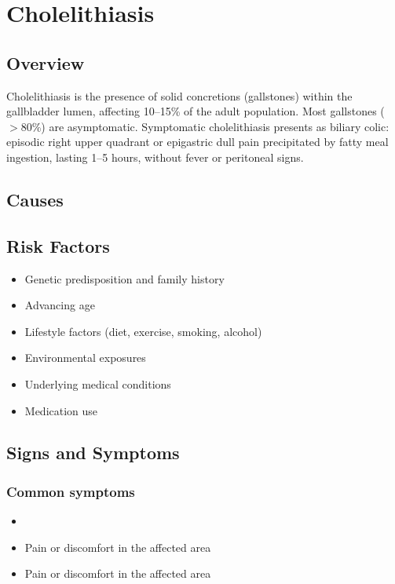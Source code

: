\chapter{Cholelithiasis}
\label{sec:Cholelithiasis}

\section{Overview}
Cholelithiasis is the presence of solid concretions (gallstones) within the gallbladder lumen, affecting 10--15\% of the adult population. Most gallstones ($>80\%$) are asymptomatic. Symptomatic cholelithiasis presents as biliary colic: episodic right upper quadrant or epigastric dull pain precipitated by fatty meal ingestion, lasting 1--5 hours, without fever or peritoneal signs.
\section{Causes}
\section{Risk Factors}

\begin{itemize}[noitemsep]
  \item Genetic predisposition and family history
  \item Advancing age
  \item Lifestyle factors (diet, exercise, smoking, alcohol)
  \item Environmental exposures
  \item Underlying medical conditions
  \item Medication use
\end{itemize}
\section{Signs and Symptoms}

\subsection{Common symptoms}
\begin{itemize}[noitemsep]
  \item \item Pain or discomfort in the affected area    \item Pain or discomfort in the affected area
  \end{itemize}

